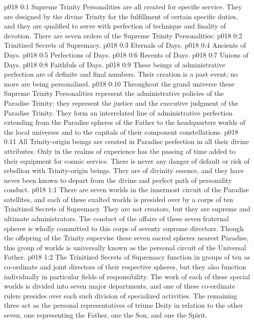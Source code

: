 \author{Divine Counselor}
\vs p018 0:1 Supreme Trinity Personalities are all created for specific service. They are designed by the divine Trinity for the fulfillment of certain specific duties, and they are qualified to serve with perfection of technique and finality of devotion. There are seven orders of the Supreme Trinity Personalities:
\pc \vs p018 0:2 \bibnobreakspace Trinitized Secrets of Supremacy.
\vs p018 0:3 \bibnobreakspace Eternals of Days.
\vs p018 0:4 \bibnobreakspace Ancients of Days.
\vs p018 0:5 \bibnobreakspace Perfections of Days.
\vs p018 0:6 \bibnobreakspace Recents of Days.
\vs p018 0:7 \bibnobreakspace Unions of Days.
\vs p018 0:8 \bibnobreakspace Faithfuls of Days.
\pc \vs p018 0:9 These beings of administrative perfection are of definite and final numbers. Their creation is a past event; no more are being personalized.
\vs p018 0:10 Throughout the grand universe these Supreme Trinity Personalities represent the administrative policies of the Paradise Trinity; they represent the justice and  the executive judgment of the Paradise Trinity. They form an interrelated line of administrative perfection extending from the Paradise spheres of the Father to the headquarters worlds of the local universes and to the capitals of their component constellations.
\vs p018 0:11 All Trinity\hyp{}origin beings are created in Paradise perfection in all their divine attributes. Only in the realms of experience has the passing of time added to their equipment for cosmic service. There is never any danger of default or risk of rebellion with Trinity\hyp{}origin beings. They are of divinity essence, and they have never been known to depart from the divine and perfect path of personality conduct.
\vs p018 1:1 There are seven worlds in the innermost circuit of the Paradise satellites, and each of these exalted worlds is presided over by a corps of ten Trinitized Secrets of Supremacy. They are not creators, but they are supreme and ultimate administrators. The conduct of the affairs of these seven fraternal spheres is wholly committed to this corps of seventy supreme directors. Though the offspring of the Trinity supervise these seven sacred spheres nearest Paradise, this group of worlds is universally known as the personal circuit of the Universal Father.
\vs p018 1:2 The Trinitized Secrets of Supremacy function in groups of ten as co\hyp{}ordinate and joint directors of their respective spheres, but they also function individually in particular fields of responsibility. The work of each of these special worlds is divided into seven major departments, and one of these co\hyp{}ordinate rulers presides over each such division of specialized activities. The remaining three act as the personal representatives of triune Deity in relation to the other seven, one representing the Father, one the Son, and one the Spirit.\plusone
